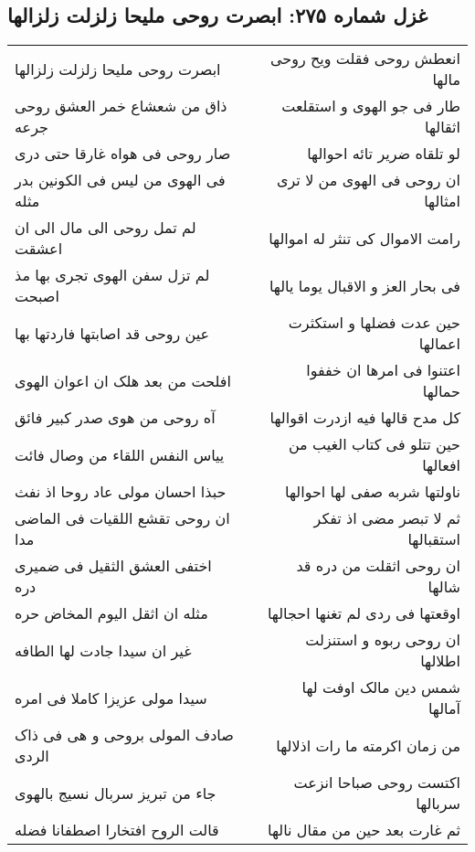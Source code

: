 \begin{center}
\section*{غزل شماره ۲۷۵: ابصرت روحی ملیحا زلزلت زلزالها}
\label{sec:0275}
\begin{longtable}{l p{0.5cm} r}
ابصرت روحی ملیحا زلزلت زلزالها
&&
انعطش روحی فقلت ویح روحی مالها
\\
ذاق من شعشاع خمر العشق روحی جرعه
&&
طار فی جو الهوی و استقلعت اثقالها
\\
صار روحی فی هواه غارقا حتی دری
&&
لو تلقاه ضریر تائه احوالها
\\
فی الهوی من لیس فی الکونین بدر مثله
&&
ان روحی فی الهوی من لا تری امثالها
\\
لم تمل روحی الی مال الی ان اعشقت
&&
رامت الاموال کی تنثر له اموالها
\\
لم تزل سفن الهوی تجری بها مذ اصبحت
&&
فی بحار العز و الاقبال یوما یالها
\\
عین روحی قد اصابتها فاردتها بها
&&
حین عدت فضلها و استکثرت اعمالها
\\
افلحت من بعد هلک ان اعوان الهوی
&&
اعتنوا فی امرها ان خففوا حمالها
\\
آه روحی من هوی صدر کبیر فائق
&&
کل مدح قالها فیه ازدرت اقوالها
\\
ییاس النفس اللقاء من وصال فائت
&&
حین تتلو فی کتاب الغیب من افعالها
\\
حبذا احسان مولی عاد روحا اذ نفث
&&
ناولتها شربه صفی لها احوالها
\\
ان روحی تقشع اللقیات فی الماضی مدا
&&
ثم لا تبصر مضی اذ تفکر استقبالها
\\
اختفی العشق الثقیل فی ضمیری دره
&&
ان روحی اثقلت من دره قد شالها
\\
مثله ان اثقل الیوم المخاض حره
&&
اوقعتها فی ردی لم تغنها احجالها
\\
غیر ان سیدا جادت لها الطافه
&&
ان روحی ربوه و استنزلت اطلالها
\\
سیدا مولی عزیزا کاملا فی امره
&&
شمس دین مالک اوفت لها آمالها
\\
صادف المولی بروحی و هی فی ذاک الردی
&&
من زمان اکرمته ما رات اذلالها
\\
جاء من تبریز سربال نسیج بالهوی
&&
اکتست روحی صباحا انزعت سربالها
\\
قالت الروح افتخارا اصطفانا فضله
&&
ثم غارت بعد حین من مقال نالها
\\
\end{longtable}
\end{center}

